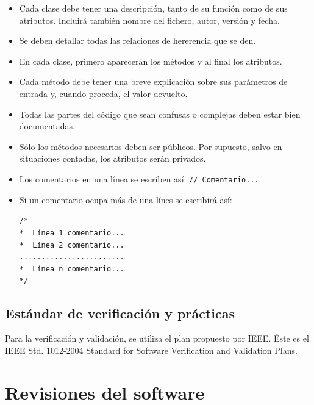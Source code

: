 \documentclass[spanish,a4paper,11pt, twoside]{report}	%
\begin{document}
	\begin{itemize}
	\item Cada clase debe tener una descripción, tanto de su función como de sus atributos. Incluirá también nombre del fichero, autor, versión y fecha.
	\item Se deben detallar todas las relaciones de hererencia que se den.
	\item En cada clase, primero aparecerán los métodos y al final los atributos.
	\item Cada método debe tener una breve explicación sobre sus parámetros de entrada y, cuando proceda, el valor devuelto.
	\item Todas las partes del código que sean confusas o complejas deben estar bien documentadas.
	\item Sólo los métodos necesarios deben ser públicos. Por supuesto, salvo en situaciones contadas, los atributos serán privados.
	\item Los comentarios en una línea se escriben así: \quad \texttt{// Comentario...}
	\item Si un comentario ocupa más de una línes se escribirá así: 

			\hspace {-0.33cm} \texttt{/*  \\
			* \ Línea 1 comentario... \\
			 * \ Línea 2 comentario... \\
			........................ \\
			* \ Línea n comentario... \\
			*/ }
	\end{itemize}


	\section{Estándar de verificación y prácticas}
	
	Para la verificación y validación, se utiliza el plan propuesto por IEEE. Éste es el IEEE Std. 1012-2004 Standard for Software Verification and Validation Plans.

\newpage
\mbox{}
\thispagestyle{empty}						%
\newpage

\chapter{ Revisiones del software}
\end{document}
